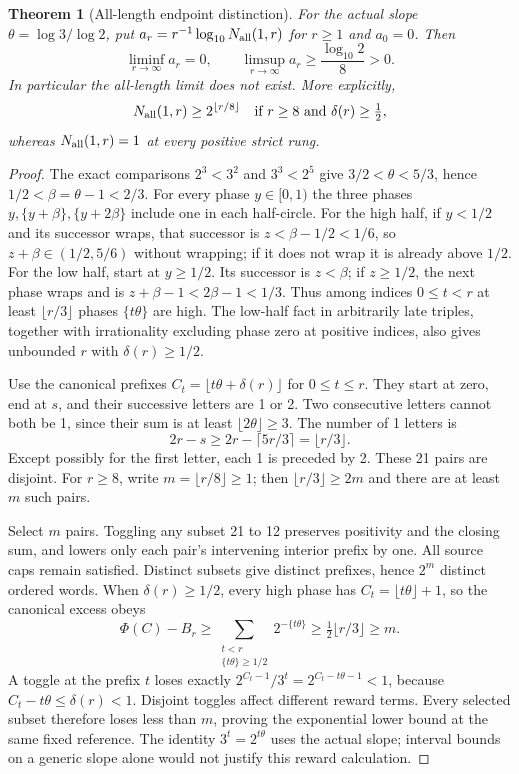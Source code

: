 \documentclass[11pt,letterpaper]{article}
\newtheorem{theorem}{Theorem}
\begin{document}
\begin{theorem}[All-length endpoint distinction]\label{thm:all-length}
For the actual slope $\theta=\log3/\log2$, put
$a_r=r^{-1}\log_{10}N_{\rm all}(1,r)$ for $r\ge1$ and $a_0=0$. Then
\[
 \liminf_{r\to\infty}a_r=0,\qquad
 \limsup_{r\to\infty}a_r\ge\frac{\log_{10}2}{8}>0.
\]
In particular the all-length limit does not exist. More explicitly,
\[
 N_{\rm all}(1,r)\ge2^{\lfloor r/8\rfloor}
 \quad\hbox{if }r\ge8\hbox{ and }\delta(r)\ge\tfrac12,
\]
whereas $N_{\rm all}(1,r)=1$ at every positive strict rung.
\end{theorem}
\begin{proof}
The exact comparisons $2^3<3^2$ and $3^3<2^5$ give
$3/2<\theta<5/3$, hence $1/2<\beta=\theta-1<2/3$.
For every phase $y\in[0,1)$ the three phases
$y,\{y+\beta\},\{y+2\beta\}$ include one in each half-circle.
For the high half, if $y<1/2$ and its successor wraps, that successor is
$z<\beta-1/2<1/6$, so $z+\beta\in(1/2,5/6)$ without wrapping; if it does
not wrap it is already above $1/2$. For the low half, start at $y\ge1/2$.
Its successor is $z<\beta$; if $z\ge1/2$, the next phase wraps and is
$z+\beta-1<2\beta-1<1/3$. Thus among indices $0\le t<r$ at least
$\lfloor r/3\rfloor$ phases $\{t\theta\}$ are high. The low-half fact in
arbitrarily late triples, together with irrationality excluding phase zero
at positive indices, also gives unbounded $r$ with $\delta(r)\ge1/2$.

Use the canonical prefixes $C_t=\lfloor t\theta+\delta(r)\rfloor$ for
$0\le t\le r$. They start at zero, end at $s$, and their successive letters
are 1 or 2. Two consecutive letters cannot both be 1, since their sum is at
least $\lfloor2\theta\rfloor\ge3$. The number of 1 letters is
\[
 2r-s\ge2r-\lceil5r/3\rceil=\lfloor r/3\rfloor.
\]
Except possibly for the first letter, each 1 is preceded by 2. These 21 pairs
are disjoint. For $r\ge8$, write $m=\lfloor r/8\rfloor\ge1$; then
$\lfloor r/3\rfloor\ge2m$ and there are at least $m$ such pairs.

Select $m$ pairs. Toggling any subset 21 to 12 preserves positivity and the
closing sum, and lowers only each pair's intervening interior prefix by one.
All source caps remain satisfied. Distinct subsets give distinct prefixes,
hence $2^m$ distinct ordered words.
When $\delta(r)\ge1/2$, every high phase has
$C_t=\lfloor t\theta\rfloor+1$, so the canonical excess obeys
\[
 \Phi(C)-B_r\ge
 \sum_{\substack{t<r\\\{t\theta\}\ge1/2}}2^{-\{t\theta\}}
 \ge\tfrac12\lfloor r/3\rfloor\ge m.
\]
A toggle at the prefix $t$ loses exactly
$2^{C_t-1}/3^t=2^{C_t-t\theta-1}<1$, because
$C_t-t\theta\le\delta(r)<1$. Disjoint toggles affect different reward
terms. Every selected subset therefore loses less than $m$, proving the
exponential lower bound at the same fixed reference. The identity
$3^t=2^{t\theta}$ uses the actual slope; interval bounds on a generic slope
alone would not justify this reward calculation.


\end{proof}
\end{document}
